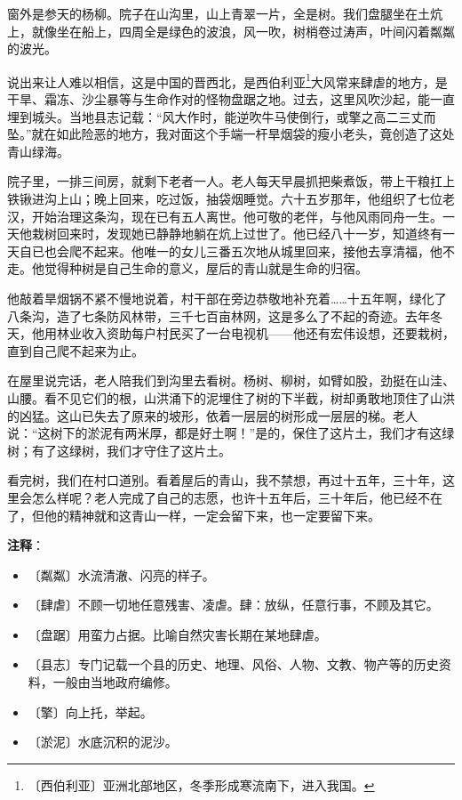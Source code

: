 \documentclass[12pt,UTF-8,openany]{ctexbook}
\begin{document}
\begin{large}
    
    窗外是参天的杨柳。院子在山沟里，山上青翠一片，全是树。我们盘腿坐在土炕上，就像坐在船上，四周全是绿色的波浪，风一吹，树梢卷过涛声，叶间闪着粼粼的波光。
    
    说出来让人难以相信，这是中国的晋西北，是西伯利亚\footnote{〔西伯利亚〕亚洲北部地区，冬季形成寒流南下，进入我国。}大风常来肆虐的地方，是干旱、霜冻、沙尘暴等与生命作对的怪物盘踞之地。过去，这里风吹沙起，能一直埋到城头。当地县志记载：“风大作时，能逆吹牛马使倒行，或擎之高二三丈而坠。”就在如此险恶的地方，我对面这个手端一杆旱烟袋的瘦小老头，竟创造了这处青山绿海。
    
    院子里，一排三间房，就剩下老者一人。老人每天早晨抓把柴煮饭，带上干粮扛上铁锹进沟上山；晚上回来，吃过饭，抽袋烟睡觉。六十五岁那年，他组织了七位老汉，开始治理这条沟，现在已有五人离世。他可敬的老伴，与他风雨同舟一生。一天他栽树回来时，发现她已静静地躺在炕上过世了。他已经八十一岁，知道终有一天自已也会爬不起来。他唯一的女儿三番五次地从城里回来，接他去享清福，他不走。他觉得种树是自己生命的意义，屋后的青山就是生命的归宿。
    
    他敲着旱烟锅不紧不慢地说着，村干部在旁边恭敬地补充着……十五年啊，绿化了八条沟，造了七条防风林带，三千七百亩林网，这是多么了不起的奇迹。去年冬天，他用林业收入资助每户村民买了一台电视机——他还有宏伟设想，还要栽树，直到自己爬不起来为止。
    
    在屋里说完话，老人陪我们到沟里去看树。杨树、柳树，如臂如股，劲挺在山洼、山腰。看不见它们的根，山洪涌下的泥埋住了树的下半截，树却勇敢地顶住了山洪的凶猛。这山已失去了原来的坡形，依着一层层的树形成一层层的梯。老人说：“这树下的淤泥有两米厚，都是好土啊！”是的，保住了这片土，我们才有这绿树；有了这绿树，我们才守住了这片土。
    
    看完树，我们在村口道别。看着屋后的青山，我不禁想，再过十五年，三十年，这里会怎么样呢？老人完成了自己的志愿，也许十五年后，三十年后，他已经不在了，但他的精神就和这青山一样，一定会留下来，也一定要留下来。
    
\end{large}


\newpage

\textbf{注释}：

\vspace{-1em}

\begin{itemize}
    \setlength\itemsep{-0.2em}
    \item 〔粼粼〕水流清澈、闪亮的样子。
    \item 〔肆虐〕不顾一切地任意残害、凌虐。肆：放纵，任意行事，不顾及其它。
    \item 〔盘踞〕用蛮力占据。比喻自然灾害长期在某地肆虐。
    \item 〔县志〕专门记载一个县的历史、地理、风俗、人物、文教、物产等的历史资料，一般由当地政府编修。
    \item 〔擎〕向上托，举起。
    \item 〔淤泥〕水底沉积的泥沙。
\end{itemize}
\end{document}
